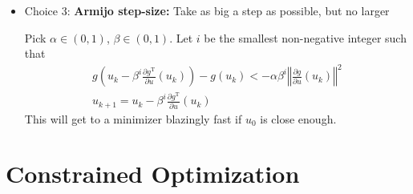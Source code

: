 \documentclass[letterpaper,12pt,titlepage]{report}
\newcommand{\trans}{^\text{T}}
\newcommand*\pder[2]{\frac{\partial #1}{\partial #2}}
\theoremstyle{plain}
\theoremstyle{definition}
\begin{document}
\begin{itemize}
\item Choice 3: \textbf{Armijo step-size:} Take as big a step as possible, but no larger

  Pick $\alpha\in(0,1)$, $\beta\in(0,1)$. Let $i$ be the smallest non-negative integer such that
  \begin{gather}
    g\left( u_k - \beta^i \pder{g\trans}{u}(u_k) \right) - g(u_k) < -\alpha\beta^i \left\Vert \pder{g}{u}(u_k) \right\Vert^2 \\
    u_{k+1} = u_k - \beta^i \pder{g\trans}{u}(u_k)
  \end{gather}
  This will get to a minimizer blazingly fast if $u_0$ is close enough.
\end{itemize}

\section{Constrained Optimization}
\end{document}
